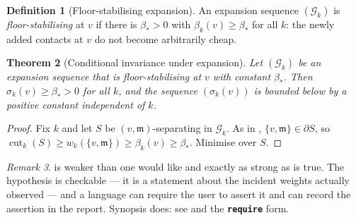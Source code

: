 \documentclass[11pt,twocolumn,a4paper]{article}
\theoremstyle{plain}
\newtheorem{theorem}{Theorem}[section]
\theoremstyle{definition}
\newtheorem{definition}[theorem]{Definition}
\theoremstyle{remark}
\newtheorem{remark}[theorem]{Remark}
\newcommand{\flo}{\beta}                       %
\newcommand{\sep}{\sigma}                      %
\newcommand{\med}{\mathfrak{m}}                %
\newcommand{\Gph}{\mathcal{G}}
\newcommand{\weight}{w}
\newcommand{\kw}[1]{\texttt{\textbf{#1}}}
\DeclareMathOperator{\cut}{cut}
\begin{document}
\begin{definition}[Floor-stabilising expansion]
\label{def:stabilising}
An expansion sequence $(\Gph_k)$ is \emph{floor-stabilising} at $v$ if
there is $\flo_\ast>0$ with $\flo_k(v)\ge\flo_\ast$ for all $k$: the
newly added contacts at $v$ do not become arbitrarily cheap.
\end{definition}

\begin{theorem}[Conditional invariance under expansion]
\label{thm:invariance}
Let $(\Gph_k)$ be an expansion sequence that is floor-stabilising at $v$
with constant $\flo_\ast$. Then $\sep_k(v)\ge\flo_\ast>0$ for all $k$,
and the sequence $(\sep_k(v))$ is bounded below by a positive constant
independent of $k$.
\end{theorem}

\begin{proof}
Fix $k$ and let $S$ be $(v,\med)$-separating in $\Gph_k$. As in
, $\{v,\med\}\in\partial S$, so
$\cut_k(S)\ge\weight_k(\{v,\med\})\ge \flo_k(v)\ge\flo_\ast$. Minimise
over $S$.
\end{proof}

\begin{remark}
 is weaker than one would like and exactly as
strong as is true. The hypothesis is checkable --- it is a statement
about the incident weights actually observed --- and a language can
require the user to assert it and can record the assertion in the
report. Synopsis does: see  and the \kw{require} form.
\end{remark}
\end{document}
